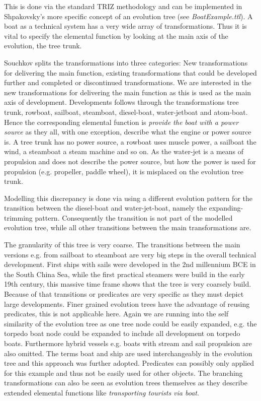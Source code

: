 \documentclass[11pt,a4paper]{article}
\begin{document}
This is done via the standard TRIZ methodology and can be implemented in
Shpakovsky's more specific concept of an evolution tree (see
\textit{BoatExample.ttl}). A boat as a technical system has a very wide array
of transformations. Thus it is vital to specify the elemental function by
looking at the main axis of the evolution, the tree trunk.

Souchkov splits the transformations into three categories: New transformations
for delivering the main function, existing transformations that could be
developed further and completed or discontinued transformations. We are
interested in the new transformations for delivering the main function as this
is used as the main axis of development. Developments follows through the
transformations tree trunk, rowboat, sailboat, steamboat, diesel-boat,
water-jetboat and atom-boat. Hence the corresponding elemental function is
\textit{provide the boat with a power source} as they all, with one exception,
describe what the engine or power source is. A tree trunk has no power source,
a rowboat uses muscle power, a sailboat the wind, a steamboat a steam machine
and so on. As the water-jet is a means of propulsion and does not describe the
power source, but how the power is used for propulsion (e.g. propeller, paddle
wheel), it is misplaced on the evolution tree trunk.

Modelling this discrepancy is done via using a different evolution pattern for
the transition between the diesel-boat and water-jet-boat, namely the
expanding-trimming pattern. Consequently the transition is not part of the
modelled evolution tree, while all other transitions between the main
transformations are. 

The granularity of this tree is very coarse. The transitions between the main
versions e.g. from sailboat to steamboat are very big steps in the overall
technical development. First ships with sails were developed in the 2nd
millennium BCE in the South China Sea, while the first practical steamers were
build in the early 19th century, this massive time frame shows that the tree
is very coarsely build. Because of that transitions or predicates are very
specific as they must depict large developments. Finer grained evolution trees
have the advantage of reusing predicates, this is not applicable here. Again
we are running into the self similarity of the evolution tree as one tree node
could be easily expanded, e.g. the torpedo boat node could be expanded to
include all development on torpedo boats. Furthermore hybrid vessels
e.g. boats with stream and sail propulsion are also omitted. The terms boat
and ship are used interchangeably in the evolution tree and this approach was
further adopted. Predicates can possibly only applied for this example and
thus not be easily used for other objects. The branching transformations can
also be seen as evolution trees themselves as they describe extended elemental
functions like \textit{transporting tourists via boat}. 
\end{document}
